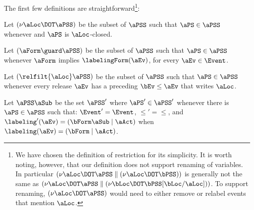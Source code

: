 \noindent
The first few definitions %
are straightforward\footnote{We have chosen the definition of restriction for
  its simplicity.  It is worth noting, however, that our definition does not
  support renaming of variables.  In particular
  $(\nu\aLoc\DOT\aPSS\parallel(\nu\aLoc\DOT\bPSS))$ is generally not the same
  as $(\nu\aLoc\DOT\aPSS\parallel(\nu\bLoc\DOT\bPSS[\bLoc/\aLoc]))$.  To
  support renaming, $(\nu\aLoc\DOT\aPSS)$ would need to either remove or
  relabel events that mention $\aLoc$.}:
\begin{definition}
Let $(\nu\aLoc\DOT\aPSS)$ be the subset of $\aPSS$ such that $\aPS\in\aPSS$ whenever
and $\aPS$ is %
$\aLoc$-closed.

Let $(\aForm \guard \aPSS)$ be the subset of $\aPSS$ such that $\aPS\in\aPSS$ whenever
$\aForm$ implies $\labelingForm(\aEv)$, for every $\aEv\in\Event$. %

Let $(\relfilt{\aLoc} \aPSS)$ be the subset of $\aPSS$ such that $\aPS\in\aPSS$ whenever
every release $\aEv$ has a preceding $\bEv\le\aEv$ that \externally writes $\aLoc$.

  Let $\aPSS\aSub$ be the set $\aPSS'$ where $\aPS'\in\aPSS'$ whenever
there is $\aPS\in\aPSS$ such that:
$\Event' = \Event$,
${\le'} = {\le}$, 
and
$\labeling'(\aEv) = (\bForm\aSub \mid \aAct)$ when $\labeling(\aEv) = (\bForm \mid \aAct)$.



%
\end{definition}
